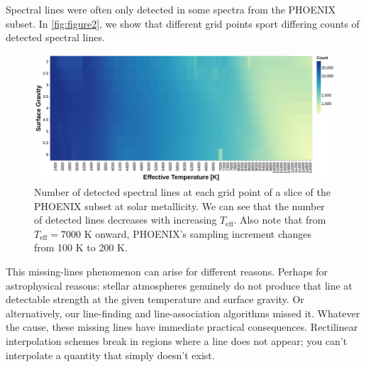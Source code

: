 \documentclass[twocolumn, linenumbers]{aastex631}
\begin{document}
Spectral lines were often only detected in some spectra from the PHOENIX subset. 
In \autoref{fig:figure2}, we show that different grid points sport differing counts of detected spectral lines.
\begin{figure}
    \centering
    \includegraphics[width=\textwidth]{figure2}
    \caption{Number of detected spectral lines at each grid point of a slice of the PHOENIX subset at solar metallicity. 
    We can see that the number of detected lines decreases with increasing $T_{\mathrm{eff}}$.
    Also note that from $T_{\mathrm{eff}} = 7000$ K onward, PHOENIX's sampling increment changes from 100 K to 200 K.}
    \label{fig:figure2}
\end{figure}

This missing-lines phenomenon can arise for different reasons.
Perhaps for astrophysical reasons: stellar atmospheres genuinely do not produce that line at detectable strength at the given temperature and surface gravity. 
Or alternatively, our line-finding and line-association algorithms missed it. 
Whatever the cause, these missing lines have immediate practical consequences. 
Rectilinear interpolation schemes break in regions where a line does not appear; you can't interpolate a quantity that simply doesn't exist.
\end{document}
